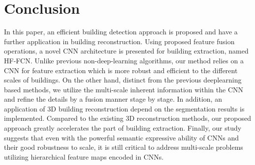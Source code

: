 \section{Conclusion}
\label{Sec:Con}
 In this paper, an efficient building detection approach is proposed and have a further application in building reconstruction.
 Using proposed feature fusion operations, a novel CNN architecture is presented for building extraction, named HF-FCN.
 Unlike previous non-deep-learning algorithms, our method relies on a CNN for feature extraction which is more robust and efficient to the different scales of buildings.
 On the other hand, distinct from the previous deeplearning based methods, we utilize the multi-scale inherent information within the CNN and refine the details by a fusion manner stage by stage.
 In addition, an application of 3D building reconstruction depend on the segmentation results is implemented.
 Compared to the existing 3D reconstruction methods, our proposed approach greatly accelerates the part of building extraction. 
 Finally, our study suggests that even with the powerful semantic expressive ability of CNNs and their good robustness to scale, it is still critical to address multi-scale problems utilizing hierarchical feature maps encoded in CNNs.


